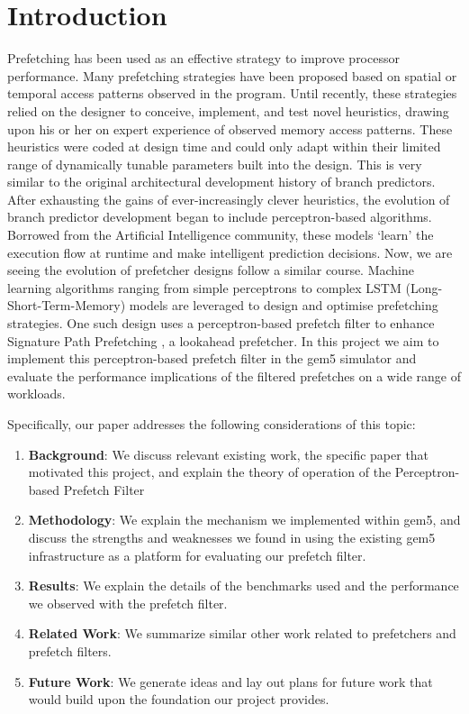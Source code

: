 \documentclass[10pt,conference]{IEEEtran}
\begin{document}
\section{Introduction}
Prefetching has been used as an effective strategy to improve processor performance. Many prefetching strategies have been proposed based on spatial or temporal access patterns observed in the program. Until recently, these strategies relied on the designer to conceive, implement, and test novel heuristics, drawing upon his or her on expert experience of observed memory access patterns. These heuristics were coded at design time and could only adapt within their limited range of dynamically tunable parameters built into the design. This is very similar to the original architectural development history of branch predictors. After exhausting the gains of ever-increasingly clever heuristics, the evolution of branch predictor development began to include perceptron-based algorithms. Borrowed from the Artificial Intelligence community, these models `learn' the execution flow at runtime and make intelligent prediction decisions. Now, we are seeing the evolution of prefetcher designs follow a similar course. Machine learning algorithms ranging from simple perceptrons to complex LSTM (Long-Short-Term-Memory) models are leveraged to design and optimise prefetching strategies. One such design uses a perceptron-based prefetch filter\cite{ppf} to enhance Signature Path Prefetching \cite{SPP}, a lookahead prefetcher. In this project we aim to implement this perceptron-based prefetch filter\cite{ppf} in the gem5 \cite{lowepower2020gem5} simulator and evaluate the performance implications of the filtered prefetches on a wide range of workloads. 

Specifically, our paper addresses the following considerations of this topic:
\begin{enumerate}
    \item\textbf{Background}: We discuss relevant existing work, the specific paper that motivated this project, and explain the theory of operation of the Perceptron-based Prefetch Filter
    \item\textbf{Methodology}: We explain the mechanism we implemented within gem5, and discuss the strengths and weaknesses we found in using the existing gem5 infrastructure as a platform for evaluating our prefetch filter.
    \item\textbf{Results}: We explain the details of the benchmarks used and the performance we observed with the prefetch filter.
    \item\textbf{Related Work}: We summarize similar other work related to prefetchers and prefetch filters.
    \item\textbf{Future Work}: We generate ideas and lay out plans for future work that would build upon the foundation our project provides.
\end{enumerate}
\end{document}
